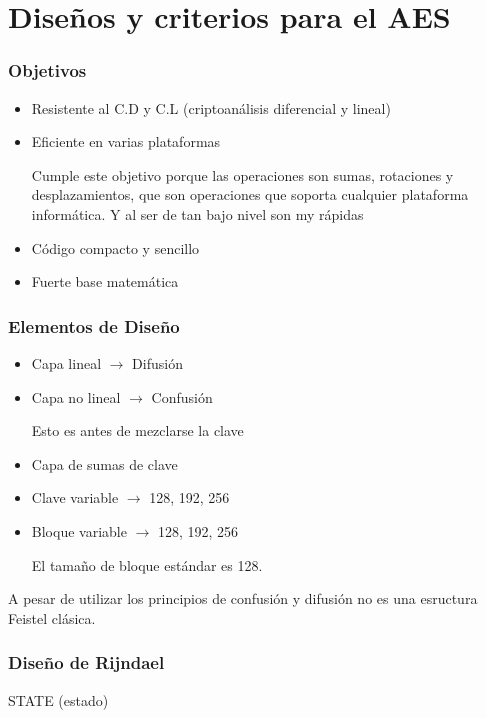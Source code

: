  
\section{Diseños y criterios para el AES}

\subsubsection{Objetivos}

\begin{itemize}
	\item Resistente al C.D y C.L (criptoanálisis diferencial y lineal)
	\item Eficiente en varias plataformas
	
	Cumple este objetivo porque las operaciones son sumas, rotaciones y desplazamientos, que son operaciones que soporta cualquier plataforma informática. Y al ser de tan bajo nivel son my rápidas
	
	\item Código compacto y sencillo
	\item Fuerte base matemática
\end{itemize}

\subsubsection{Elementos de Diseño}

\begin{itemize}
	\item Capa lineal $\rightarrow$ Difusión
	\item Capa no lineal $\rightarrow$ Confusión
	
	Esto es antes de mezclarse la clave
	\item Capa de sumas de clave
	\item Clave variable $\rightarrow$ 128, 192, 256
	\item Bloque variable $\rightarrow$ 128, 192, 256
	
	El tamaño de bloque estándar es 128.
\end{itemize}

A pesar de utilizar los principios de confusión y difusión no es una esructura Feistel clásica.
 
\subsubsection{Diseño de Rijndael}

STATE (estado)

